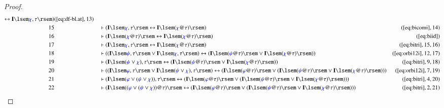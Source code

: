 \begin{proof}
\begin{align}
      \leftrightarrow \mathbf{I} \lsem \mw{\chi} , \tau \rsem
      )&(\mbox{\ref{eq:df-bl.at}},13)\notag
  \\ 15 &&  & \vdash ( \mathbf{I} \lsem \mw{\chi} , \tau \rsem
      \leftrightarrow \mathbf{I} \lsem ( \mw{\chi} @ \tau ) \rsem
      )&(\mbox{\ref{eq:bicomi}},14)\notag
  \\ 16 &&  & \vdash ( \mathbf{I} \lsem ( \mw{\chi} @ \tau ) \rsem
      \leftrightarrow \mathbf{I} \lsem ( \mw{\chi} @ \tau ) \rsem
      )&(\mbox{\ref{eq:biid}})\notag
  \\ 17 &&  & \vdash ( \mathbf{I} \lsem \mw{\chi} , \tau \rsem
      \leftrightarrow \mathbf{I} \lsem ( \mw{\chi} @ \tau ) \rsem
      )&(\mbox{\ref{eq:bitri}},15,16)\notag
  \\ 18 &&  & \vdash ( ( \mathbf{I} \lsem \mw{\psi} , \tau \rsem \vee
      \mathbf{I} \lsem \mw{\chi} , \tau \rsem ) \leftrightarrow (
      \mathbf{I} \lsem ( \mw{\psi} @ \tau ) \rsem \vee \mathbf{I}
      \lsem ( \mw{\chi} @ \tau ) \rsem )
      )&(\mbox{\ref{eq:orbi12i}},12,17)\notag
  \\ 19 &&  & \vdash ( \mathbf{I} \lsem ( \mw{\psi} \vee \mw{\chi} ) ,
      \tau \rsem \leftrightarrow ( \mathbf{I} \lsem ( \mw{\psi} @ \tau
      ) \rsem \vee \mathbf{I} \lsem ( \mw{\chi} @ \tau ) \rsem )
      )&(\mbox{\ref{eq:bitri}},9,18)\notag
  \\ 20 &&  & \vdash ( ( \mathbf{I} \lsem \mw{\varphi} , \tau \rsem
      \vee \mathbf{I} \lsem ( \mw{\psi} \vee \mw{\chi} ) , \tau \rsem
      ) \leftrightarrow ( \mathbf{I} \lsem ( \mw{\varphi} @ \tau )
      \rsem \vee ( \mathbf{I} \lsem ( \mw{\psi} @ \tau ) \rsem \vee
      \mathbf{I} \lsem ( \mw{\chi} @ \tau ) \rsem ) )
      )&(\mbox{\ref{eq:orbi12i}},7,19)\notag
  \\ 21 &&  & \vdash ( \mathbf{I} \lsem ( \mw{\varphi} \vee (
      \mw{\psi} \vee \mw{\chi} ) ) , \tau \rsem \leftrightarrow (
      \mathbf{I} \lsem ( \mw{\varphi} @ \tau ) \rsem \vee ( \mathbf{I}
      \lsem ( \mw{\psi} @ \tau ) \rsem \vee \mathbf{I} \lsem (
      \mw{\chi} @ \tau ) \rsem ) )
      )&(\mbox{\ref{eq:bitri}},4,20)\notag
  \\ 22 &&  & \vdash ( \mathbf{I} \lsem ( ( \mw{\varphi} \vee (
      \mw{\psi} \vee \mw{\chi} ) ) @ \tau ) \rsem \leftrightarrow (
      \mathbf{I} \lsem ( \mw{\varphi} @ \tau ) \rsem \vee ( \mathbf{I}
      \lsem ( \mw{\psi} @ \tau ) \rsem \vee \mathbf{I} \lsem (
      \mw{\chi} @ \tau ) \rsem ) )
      )&(\mbox{\ref{eq:bitri}},2,21)\notag
\end{align}
\end{proof}


